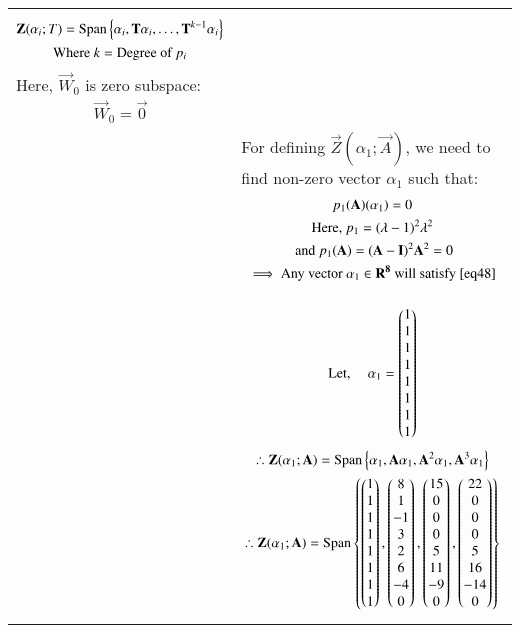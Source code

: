 \documentclass[journal,12pt]{IEEEtran}
\begin{document}
\begin{longtable}{|p{4cm}|p{14cm}|}
	    \begin{gather}
	    \vec{Z}(\alpha_i;T)=\text{Span}\cbrak{\alpha_i,\vec{T}\alpha_i,\hdots,\vec{T}^{k-1}\alpha_i}\\
	    \text{Where }k=\text{Degree of $p_i$}
	    \end{gather}
        Here, $\vec{W}_0$ is zero subspace:
        \begin{gather}
             \vec{W}_0=\vec{0} 
        \end{gather}\\
        &For defining $\vec{Z}(\alpha_1;\vec{A})$, we need to find non-zero vector $\alpha_1$ such that: 
        \begin{gather}
        p_1(\vec{A})(\alpha_1)=0 \label{eq48}\\
        \text{Here, }p_1=(\lambda-1)^2\lambda^2 \\
        \text{ and } p_1(\vec{A})=(\vec{A}-\vec{I})^2\vec{A}^2=0\\
        \implies \text{Any vector $\alpha_1 \in \vec{R^8}$ will satisfy $\eqref{eq48}$} \nonumber
        \end{gather}\\
        &\begin{gather}
        \text{Let,  } \quad \alpha_1=\myvec{1\\1\\1\\1\\1\\1\\1\\1}
        \end{gather}
        \begin{gather}
        \therefore \vec{Z}(\alpha_1;\vec{A})=\text{Span}\cbrak{\alpha_1,\vec{A}\alpha_1,\vec{A}^{2}\alpha_1,\vec{A}^{3}\alpha_1}\\
         \therefore \vec{Z}(\alpha_1;\vec{A})=\text{Span}\cbrak{\myvec{1\\1\\1\\1\\1\\1\\1\\1},\myvec{8\\1\\-1\\3\\2\\6\\-4\\0},\myvec{15\\0\\0\\0\\5\\11\\-9\\0},\myvec{22\\0\\0\\0\\5\\16\\-14\\0}}\\

\end{gather}
\end{longtable}
\end{document}
